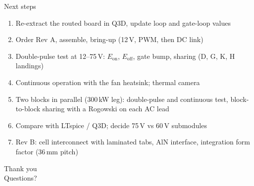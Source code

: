 \documentclass[aspectratio=169,10pt]{beamer}
\begin{document}
\begin{frame}{Next steps}
\begin{enumerate}
\item Re-extract the routed board in Q3D, update loop and gate-loop values
\item Order Rev A, assemble, bring-up (12\,V, PWM, then DC link)
\item Double-pulse test at 12--75\,V: $E_\mathrm{on}$, $E_\mathrm{off}$, gate bump, sharing (D, G, K, H landings)
\item Continuous operation with the fan heatsink; thermal camera
\item Two blocks in parallel (300\,kW leg): double-pulse and continuous test, block-to-block sharing with a Rogowski on each AC lead
\item Compare with LTspice / Q3D; decide 75\,V vs 60\,V submodules
\item Rev B: cell interconnect with laminated tabs, AlN interface, integration form factor (36\,mm pitch)
\end{enumerate}
\end{frame}

\begin{frame}[standout]
Thank you\\[1ex]
\small Questions?
\end{frame}
\end{document}
